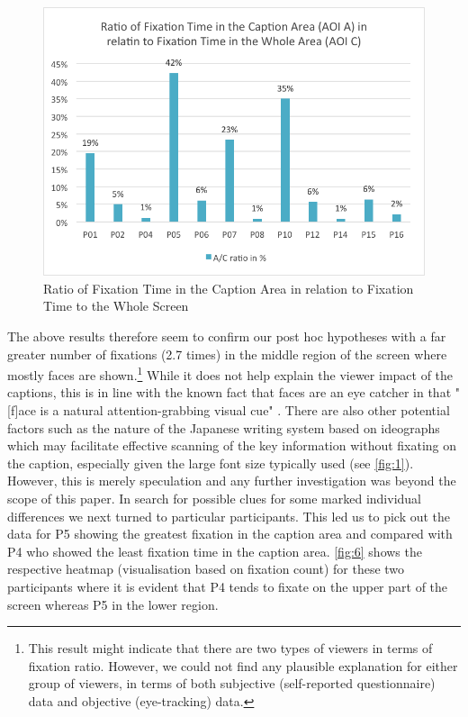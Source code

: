 \documentclass[output=paper]{langsci/langscibook}
\begin{document}
\begin{figure}
 \includegraphics[width=\textwidth]{figures/OHagan5.png}
\caption{Ratio of Fixation Time in the Caption Area in relation to Fixation Time to the Whole Screen}
\label{fig:5}
\end{figure}


The above results therefore seem to confirm our post hoc hypotheses with a far greater number of fixations (2.7 times) in the middle region of the screen where mostly faces are shown.\footnote{ This result might indicate that there are two types of viewers in terms of fixation ratio. However, we could not find any plausible explanation for either group of viewers, in terms of both subjective (self-reported questionnaire) data and objective (eye-tracking) data.} While it does not help explain the viewer impact of the captions, this is in line with the known fact that faces are an eye catcher in that "[f]ace is a natural attention-grabbing visual cue" \citep[pg. 264]{perego2010}. There are also other potential factors such as the nature of the Japanese writing system based on ideographs which may facilitate effective scanning of the key information without fixating on the caption, especially given the large font size typically used (see \ref{fig:1}). However, this is merely speculation and any further investigation was beyond the scope of this paper. In search for possible clues for some marked individual differences we next turned to particular participants.  This led us to pick out the data for P5 showing the greatest fixation in the caption area and compared with P4 who showed the least fixation time in the caption area.  \ref{fig:6} shows the respective heatmap (visualisation based on fixation count) for these two participants where it is evident that P4 tends to fixate on the upper part of the screen whereas P5 in the lower region.
\end{document}
